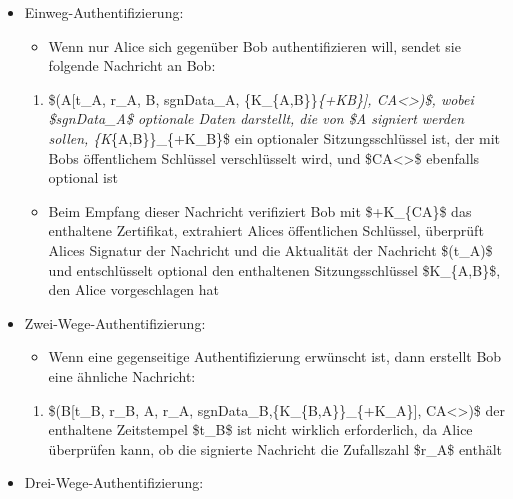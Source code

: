 \documentclass[a4paper]{article}
\begin{document}
\begin{multicols}{3}
    \begin{itemize}
        \item
              Einweg-Authentifizierung:

              \begin{itemize}
                  \item
                        Wenn nur Alice sich gegenüber Bob authentifizieren will, sendet sie
                        folgende Nachricht an Bob:
              \end{itemize}

              \begin{enumerate}
                  \def\labelenumi{\arabic{enumi}.}
                  \item
                        \$(A{[}t\_A, r\_A, B, sgnData\_A, \{K\_\{A,B\}\}\emph{\{+KB\}{]},
                        CA\textless{}\textgreater)\$, wobei \$sgnData\_A\$ optionale Daten
                        darstellt, die von \$A signiert werden sollen,
                        \{K}\{A,B\}\}\_\{+K\_B\}\$ ein optionaler Sitzungsschlüssel ist, der
                        mit Bobs öffentlichem Schlüssel verschlüsselt wird, und
                        \$CA\textless{}\textgreater\$ ebenfalls optional ist
              \end{enumerate}

              \begin{itemize}
                  \item
                        Beim Empfang dieser Nachricht verifiziert Bob mit \$+K\_\{CA\}\$ das
                        enthaltene Zertifikat, extrahiert Alices öffentlichen Schlüssel,
                        überprüft Alices Signatur der Nachricht und die Aktualität der
                        Nachricht \$(t\_A)\$ und entschlüsselt optional den enthaltenen
                        Sitzungsschlüssel \$K\_\{A,B\}\$, den Alice vorgeschlagen hat
              \end{itemize}
        \item
              Zwei-Wege-Authentifizierung:

              \begin{itemize}
                  \item
                        Wenn eine gegenseitige Authentifizierung erwünscht ist, dann
                        erstellt Bob eine ähnliche Nachricht:
              \end{itemize}

              \begin{enumerate}
                  \def\labelenumi{\arabic{enumi}.}
                  \setcounter{enumi}{1}
                  \item
                        \$(B{[}t\_B, r\_B, A, r\_A, sgnData\_B,\{K\_\{B,A\}\}\_\{+K\_A\}{]},
                        CA\textless{}\textgreater)\$ der enthaltene Zeitstempel \$t\_B\$ ist
                        nicht wirklich erforderlich, da Alice überprüfen kann, ob die
                        signierte Nachricht die Zufallszahl \$r\_A\$ enthält
              \end{enumerate}
        \item
              Drei-Wege-Authentifizierung:


\end{itemize}
\end{multicols}
\end{document}
